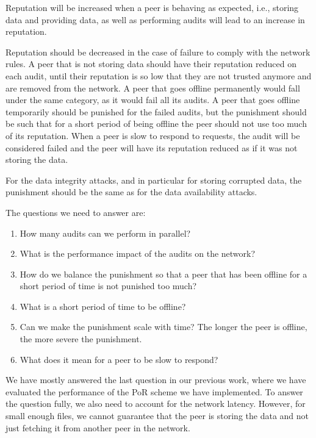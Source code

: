 Reputation will be increased when a peer is behaving as expected,
i.e., storing data and providing data, as well as performing audits will lead to an increase in reputation.

Reputation should be decreased in the case of failure to comply with the network rules.
A peer that is not storing data should have their reputation reduced on each audit,
until their reputation is so low that they are not trusted anymore and are removed from the network.
A peer that goes offline permanently would fall under the same category, as it would fail all its audits.
A peer that goes offline temporarily should be punished for the failed audits,
but the punishment should be such that for a short period of being offline the peer should not use 
too much of its reputation.
When a peer is slow to respond to requests, the audit will be considered failed and the peer will have
its reputation reduced as if it was not storing the data.

For the data integrity attacks, and in particular for storing corrupted data,
the punishment should be the same as for the data availability attacks.

The questions we need to answer are:
\begin{enumerate}
    \item How many audits can we perform in parallel?
    \item What is the performance impact of the audits on the network?
    \item How do we balance the punishment so that a peer that has been offline for a short period of time
        is not punished too much?
    \item What is a short period of time to be offline?
    \item Can we make the punishment scale with time? The longer the peer is offline, the more severe the punishment.
    \item What does it mean for a peer to be slow to respond?
\end{enumerate}

We have mostly answered the last question in our previous work, where we have evaluated the performance of
the PoR scheme we have implemented.
To answer the question fully, we also need to account for the network latency.
However, for small enough files, we cannot guarantee that the peer is storing the data
and not just fetching it from another peer in the network.


